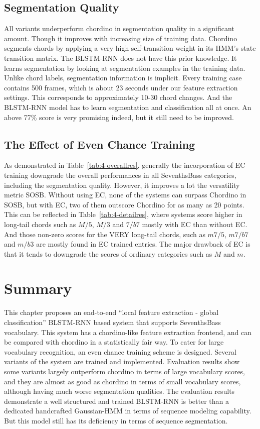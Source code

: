 \subsection{Segmentation Quality}
All variants underperform chordino in segmentation quality in a significant amount. Though it improves with increasing size of training data. Chordino segments chords by applying a very high self-transition weight in its HMM's state transition matrix. The BLSTM-RNN does not have this prior knowledge. It learns segmentation by looking at segmentation examples in the training data. Unlike chord labels, segmentation information is implicit. Every training case contains 500 frames, which is about 23 seconds under our feature extraction settings. This corresponds to approximately 10-30 chord changes. And the BLSTM-RNN model has to learn segmentation and classification all at once. An above 77\% score is very promising indeed, but it still need to be improved.

\subsection{The Effect of Even Chance Training}
As demonstrated in Table~\ref{tab:4-overallres}, generally the incorporation of EC training downgrade the overall performances in all SeventhsBass categories, including the segmentation quality. However, it improves a lot the versatility metric SOSB. Without using EC, none of the systems can surpass Chordino in SOSB, but with EC, two of them outscore Chordino for as many as 20 points. This can be reflected in Table~\ref{tab:4-detailres}, where systems score higher in long-tail chords such as $M/5$, $M/3$ and $7/b7$ mostly with EC than without EC. And those non-zero scores for the VERY long-tail chords, such as $m7/5$, $m7/b7$ and $m/b3$ are mostly found in EC trained entries. The major drawback of EC is that it tends to downgrade the scores of ordinary categories such as $M$ and $m$.

\section{Summary}\label{sec:4-concln}
This chapter proposes an end-to-end ``local feature extraction - global classification'' BLSTM-RNN based system that supports SeventhsBass vocabulary. This system has a chordino-like feature extraction frontend, and can be compared with chordino in a statistically fair way. To cater for large vocabulary recognition, an even chance training scheme is designed. Several variants of the system are trained and implemented. Evaluation results show some variants largely outperform chordino in terms of large vocabulary scores, and they are almost as good as chordino in terms of small vocabulary scores, although having much worse segmentation qualities. The evaluation results demonstrate a well structured and trained BLSTM-RNN is better than a dedicated handcrafted Gaussian-HMM in terms of sequence modeling capability. But this model still has its deficiency in terms of sequence segmentation.

